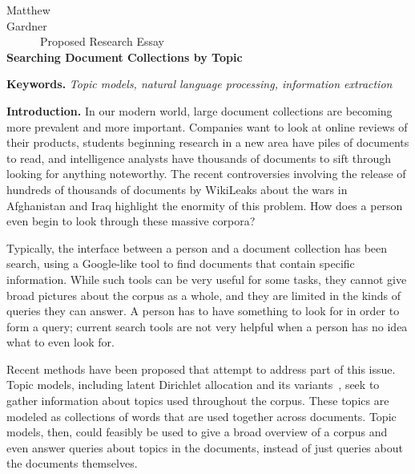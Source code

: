 \documentclass[onecolumn, 12pt]{article}
\begin{document}
\pagestyle{empty}

\begin{center}
  Matthew Gardner\ \ \ \ \ \ \ \ \ \ \ \ \ \ \ \ \ \ \ \ \ \ \ \ \ \ \ \ \ \ \ 
  \ \ \ \ \ \ \ \ \ \ \ \ \ \ \ \ \ \ \ \ \ \ \ \ \ \ \ \ \ \ \ \ \ \ \ \ \ \ \ 
  Proposed Research Essay
  \\
  \textbf{Searching Document Collections by Topic}
\end{center}
\vspace{-4mm}

\textbf{Keywords.} \textit{Topic models, natural language processing,
information extraction}

\textbf{Introduction.}  In our modern world, large document collections are
becoming more prevalent and more important.  Companies want to look at online
reviews of their products, students beginning research in a new area have piles
of documents to read, and intelligence analysts have thousands of documents to
sift through looking for anything noteworthy.  The recent controversies
involving the release of hundreds of thousands of documents by WikiLeaks about
the wars in Afghanistan and Iraq highlight the enormity of this problem.  How
does a person even begin to look through these massive corpora?

Typically, the interface between a person and a document collection has been
search, using a Google-like tool to find documents that contain specific
information.  While such tools can be very useful for some tasks, they cannot
give broad pictures about the corpus as a whole, and they are limited in the
kinds of queries they can answer.  A person has to have something to look for
in order to form a query; current search tools are not very helpful when a
person has no idea what to even look for.

Recent methods have been proposed that attempt to address part of this issue.
Topic models, including latent Dirichlet allocation and its
variants~\cite{blei-2003-latent-dirichlet-allocation}, seek to gather
information about topics used throughout the corpus.  These topics are modeled
as collections of words that are used together across documents.  Topic models,
then, could feasibly be used to give a broad overview of a corpus and even
answer queries about topics in the documents, instead of just queries about the
documents themselves.
\end{document}
